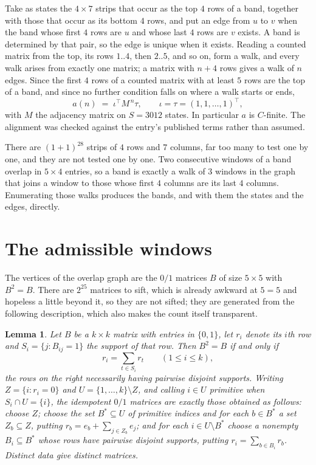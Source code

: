 \documentclass[11pt,a4paper]{article}
\theoremstyle{plain}
\newtheorem{lemma}[theorem]{Lemma}
\theoremstyle{definition}
\begin{document}
Take as states the $4\times7$ strips that occur as the top $4$ rows of a band,
together with those that occur as its bottom $4$ rows, and put an edge from $u$ to $v$
when the band whose first $4$ rows are $u$ and whose last $4$ rows are $v$ exists.
A band is determined by that pair, so the edge is unique when it exists. Reading a counted
matrix from the top, its rows $1..4$, then $2..5$, and so on, form a walk, and every
walk arises from exactly one matrix; a matrix with $n+4$ rows gives a walk of $n$ edges.
Since the first $4$ rows of a counted matrix with at least $5$ rows are the top of a
band, and since no further condition falls on where a walk starts or ends,
\[
a(n)\;=\;\iota^{\!\top}M^{\,n}\tau ,\qquad \iota=\tau=(1,1,\dots,1)^{\!\top},
\]
with $M$ the adjacency matrix on $S=3012$ states. In particular $a$ is $C$-finite. The
alignment was checked against the entry's published terms rather than assumed.

There are $(1 + 1)^{28}$ strips of $4$ rows and $7$ columns, far too
many to test one by one, and they are not tested one by one. Two consecutive windows of a band
overlap in $5\times4$ entries, so a band is exactly a walk of $3$ windows in
the graph that joins a window to those whose first $4$ columns are its last $4$
columns. Enumerating those walks produces the bands, and with them the states and the edges,
directly.

\section{The admissible windows}

The vertices of the overlap graph are the $0/1$ matrices $B$ of size $5\times5$ with
$B^2=B$. There are $2^{25}$ matrices to sift, which is already awkward at $5=5$ and
hopeless a little beyond it, so they are not sifted; they are generated from the following
description, which also makes the count itself transparent.

\begin{lemma}\label{lem:idem}
Let $B$ be a $k\times k$ matrix with entries in $\{0,1\}$, let $r_i$ denote its $i$th row and
$S_i=\{j:B_{ij}=1\}$ the support of that row. Then $B^2=B$ if and only if
\[
r_i=\sum_{t\in S_i}r_t \qquad (1\le i\le k),
\]
the rows on the right necessarily having pairwise disjoint supports. Writing
$Z=\{i:r_i=0\}$ and $U=\{1,\dots,k\}\setminus Z$, and calling $i\in U$ \emph{primitive}
when $S_i\cap U=\{i\}$, the idempotent $0/1$ matrices are exactly those obtained as follows:
choose $Z$; choose the set $B^{\ast}\subseteq U$ of primitive indices and for each
$b\in B^{\ast}$ a set $Z_b\subseteq Z$, putting $r_b=e_b+\sum_{j\in Z_b}e_j$; and for each
$i\in U\setminus B^{\ast}$ choose a nonempty $B_i\subseteq B^{\ast}$ whose rows have
pairwise disjoint supports, putting $r_i=\sum_{b\in B_i}r_b$. Distinct data give distinct
matrices.
\end{lemma}
\end{document}
